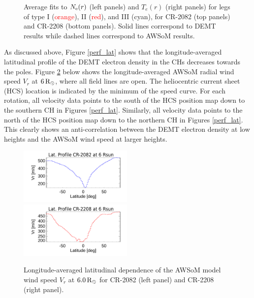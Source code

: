 \documentclass[namedreferences]{solarphysics}
\def\edit#1{\textcolor{Red}{#1}}
\newcommand{\mrsun}{{\rm R_\odot}}
\newcommand{\Ne}{N_{\rm e}}
\begin{document}
\begin{article}
\begin{figure}[h!]
\begin{center}
\caption{{Average fits to $\Ne(r)$ (left panels) and $T_e(r)$ (right panels) for legs of {type I (\edit{orange}), II (\edit{red}), and III (cyan)}, for CR-2082 (top panels) and CR-2208 (bottom panels). Solid lines correspond to DEMT results while dashed lines correspond to AWSoM results.}}
\label{perfiles_promedio}
\end{center}
\end{figure}

{As discussed above, Figure \ref{perf_lat} shows that the longitude-averaged latitudinal profile of the DEMT electron density in the CHs decreases towards the poles. Figure \ref{perf_lon_vr} below shows the longitude-averaged AWSoM radial wind speed $V_r$ at $6\,\mrsun$, where all field lines are open. The heliocentric current sheet (HCS) location is indicated by the minimum of the speed curve. For each rotation, all velocity data points to the south of the HCS position map down to the southern CH in Figures \ref{perf_lat}. Similarly, all velocity data points to the north of the HCS position map down to the northern CH in Figures \ref{perf_lat}. This clearly shows an anti-correlation between the DEMT electron density at low heights and the AWSoM wind speed at larger heights.}

\begin{figure}[h!]
\begin{center}
\includegraphics[width=0.495\textwidth]{figs/Perfil_Vr_2082_5995_2.pdf}
\includegraphics[width=0.495\textwidth]{figs/Perfil_Vr_2208_5995_2.pdf}
\caption{{Longitude-averaged latitudinal dependence of the AWSoM model {wind speed $V_r$} at $6.0\,\mrsun$ for CR-2082 (left panel) and CR-2208 (right panel).}}
\label{perf_lon_vr}
\end{center}
\end{figure}


\end{article}
\end{document}

